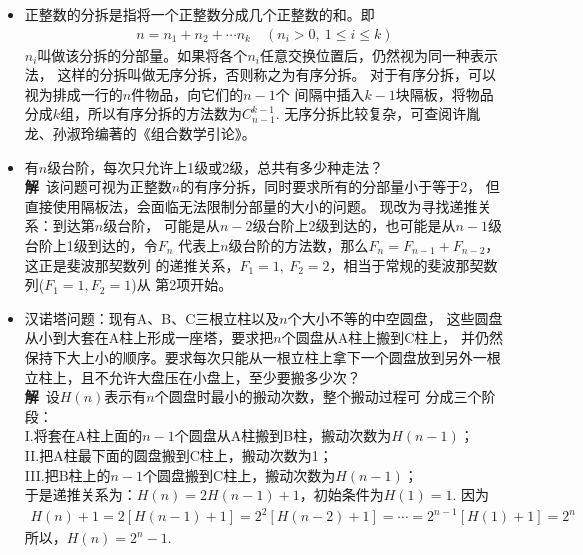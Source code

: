\begin{itemize}[leftmargin=\inteval{\myitemleftmargin}pt,itemsep=
   \inteval{\myitemitempsep}pt,topsep=\inteval{\myitemtopsep}pt]
\item 正整数的分拆是指将一个正整数分成几个正整数的和。即
\begin{align*}
    n=n_1+n_2+\cdots n_k \quad (n_i>0,\ 1\leq i\leq k)
\end{align*}
$ n_i $叫做该分拆的分部量。如果将各个$ n_i $任意交换位置后，仍然视为同一种表示法，
这样的分拆叫做无序分拆，否则称之为有序分拆。
对于有序分拆，可以视为排成一行的$ n $件物品，向它们的$ n-1 $个
间隔中插入$ k-1 $块隔板，将物品分成$ k $组，所以有序分拆的方法数为$ C_{n-1}^{k-1} $. 
无序分拆比较复杂，可查阅许胤龙、孙淑玲编著的《组合数学引论》。

\item 有$ n $级台阶，每次只允许上1级或2级，总共有多少种走法？\\
\textbf{解}\ 该问题可视为正整数$ n $的有序分拆，同时要求所有的分部量小于等于2，
但直接使用隔板法，会面临无法限制分部量的大小的问题。
现改为寻找递推关系：到达第$ n $级台阶，
可能是从$ n-2 $级台阶上2级到达的，也可能是从$ n-1 $级台阶上1级到达的，令$ F_n $
代表上$ n $级台阶的方法数，那么$ F_n=F_{n-1}+F_{n-2} $，这正是斐波那契数列
的递推关系，$ F_1=1,\ F_2=2 $，相当于常规的斐波那契数列($ F_1=1,F_2=1 $)从
第2项开始。

\item 汉诺塔问题：现有A、B、C三根立柱以及$ n $个大小不等的中空圆盘，
这些圆盘从小到大套在A柱上形成一座塔，要求把$ n $个圆盘从A柱上搬到C柱上，
并仍然保持下大上小的顺序。要求每次只能从一根立柱上拿下一个圆盘放到另外一根
立柱上，且不允许大盘压在小盘上，至少要搬多少次？\\
\textbf{解}\ 设$ H(n) $表示有$ n $个圆盘时最小的搬动次数，整个搬动过程可
分成三个阶段：\\
I.将套在A柱上面的$ n-1 $个圆盘从A柱搬到B柱，搬动次数为$ H(n-1) $；\\
II.把A柱最下面的圆盘搬到C柱上，搬动次数为1；\\
III.把B柱上的$ n-1 $个圆盘搬到C柱上，搬动次数为$ H(n-1) $；\\
于是递推关系为：$ H(n)=2H(n-1)+1 $，初始条件为$ H(1)=1 $. 因为
\begin{align*}
    H(n)+1=2[H(n-1)+1]=2^2[H(n-2)+1]=\cdots=2^{n-1}[H(1)+1]=2^n
\end{align*}
所以，$ H(n)=2^n-1 $. 


\end{itemize}
